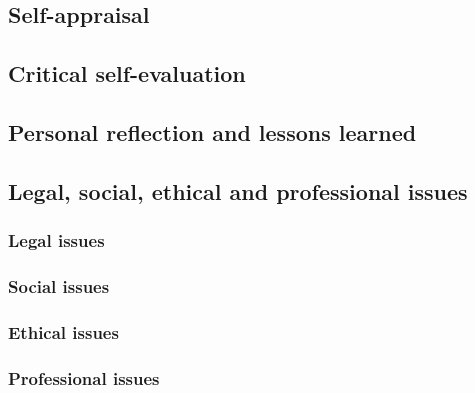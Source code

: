 \begin{appendices}

%
%
\chapter{Self-appraisal}


    \section{Critical self-evaluation}

    \section{Personal reflection and lessons learned}

    \section{Legal, social, ethical and professional issues}


    \subsection{Legal issues}

    \subsection{Social issues}

    \subsection{Ethical issues}

    \subsection{Professional issues}



\end{appendices}
